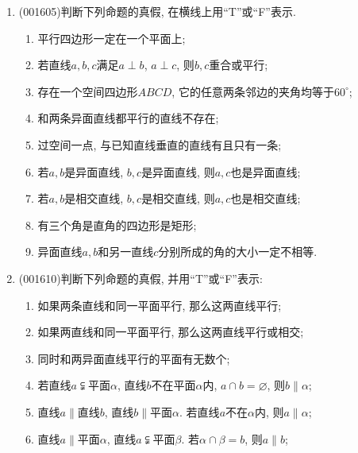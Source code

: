 \documentclass[10pt,a4paper]{article}
\newcommand{\blank}[1]{\underline{\hbox to #1pt{}}}
\begin{document}
\begin{enumerate}[1.]
\item {\tiny (001605)}判断下列命题的真假, 在横线上用``T''或``F''表示.\\ 
\begin{enumerate}[\blank{30}(1)]
\item 平行四边形一定在一个平面上;\\ 
\item 若直线$a,b,c$满足$a\perp b$, $a\perp c$, 则$b,c$重合或平行;\\ 
\item 存在一个空间四边形$ABCD$, 它的任意两条邻边的夹角均等于$60^\circ$;\\ 
\item 和两条异面直线都平行的直线不存在;\\ 
\item 过空间一点, 与已知直线垂直的直线有且只有一条;\\ 
\item 若$a,b$是异面直线, $b,c$是异面直线, 则$a,c$也是异面直线;\\ 
\item 若$a,b$是相交直线, $b,c$是相交直线, 则$a,c$也是相交直线;\\ 
\item 有三个角是直角的四边形是矩形;\\ 
\item 异面直线$a,b$和另一直线$c$分别所成的角的大小一定不相等.\\ 
\end{enumerate}
\item {\tiny (001610)}判断下列命题的真假, 并用``{\rm T}''或``{\rm F}''表示:
\begin{enumerate}[\blank{30}(1)]
\item 如果两条直线和同一平面平行, 那么这两直线平行;\\ 
\item 如果两直线和同一平面平行, 那么这两直线平行或相交;\\ 
\item 同时和两异面直线平行的平面有无数个;\\ 
\item 若直线$a\subsetneqq$平面$\alpha$, 直线$b$不在平面$\alpha$内, $a\cap b=\varnothing$, 则$b \parallel \alpha$;\\ 
\item 直线$a\parallel$直线$b$, 直线$b\parallel$平面$\alpha$. 若直线$a$不在$\alpha$内, 则$a\parallel \alpha$;\\ 
\item 直线$a\parallel$平面$\alpha$, 直线$a\subsetneqq$平面$\beta$. 若$\alpha\cap\beta=b$, 则$a\parallel b$;\\ 

\end{enumerate}
\end{enumerate}
\end{document}
